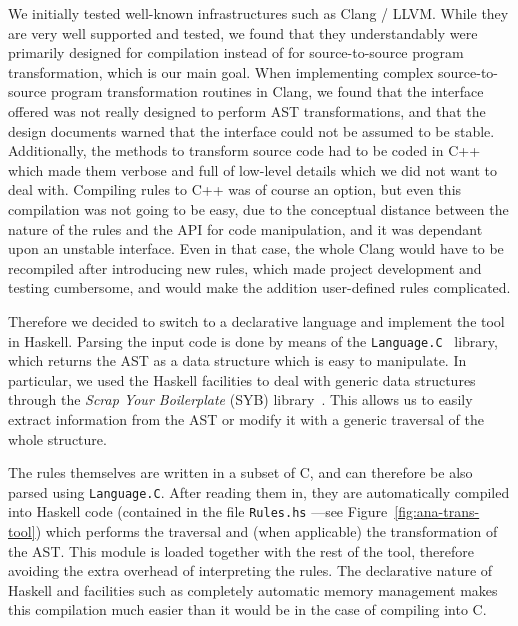 \documentclass[svgnames,usenames,preprint,nocopyrightspace]{sigplanconf}
\begin{document}
We initially tested well-known infrastructures such as Clang / LLVM.
While they are very well supported and tested, we found that they
understandably were primarily designed for compilation instead of for
source-to-source program transformation, which is our main goal.  When
implementing complex source-to-source program transformation routines
in Clang, we found that the interface offered was not really designed
to perform AST transformations, and that the design documents warned
that the interface could not be assumed to be stable.  Additionally,
the methods to transform source code had to be coded in C++ which made
them verbose and full of low-level details which we did not want to
deal with.  Compiling rules to C++ was of course an option, but even
this compilation was not going to be easy, due to the conceptual
distance between the nature of the rules and the API for code
manipulation, and it was dependant upon an unstable interface.  Even
in that case, the whole Clang would have to be recompiled after
introducing new rules, which made project development and testing
cumbersome, and would make the addition user-defined rules complicated.

Therefore we decided to switch to a declarative language and implement
the tool in Haskell.  Parsing the input code is done by means of the 
\texttt{Language.C}~\cite{LanguageC} library, which returns the AST as
a data structure which is easy to manipulate.  In particular, we used
the Haskell facilities to deal with generic data structures through
the \emph{Scrap Your Boilerplate} (SYB) library~\cite{DataGenerics}.  This
allows us to easily extract information from the AST or modify it with
a generic traversal of the whole structure. 

The rules themselves are written in a subset of C, and can therefore
be also parsed using \texttt{Language.C}.  After reading them in, they
are automatically compiled into Haskell code (contained in the file
\texttt{Rules.hs} ---see Figure~\ref{fig:ana-trans-tool}) which
performs the traversal and (when applicable) the transformation of the
AST.  This module is loaded together with the rest of the tool,
therefore avoiding the extra overhead of interpreting the rules.  The
declarative nature of Haskell and facilities such as completely
automatic memory management makes this compilation much easier than it
would be in the case of compiling into C.
\end{document}
